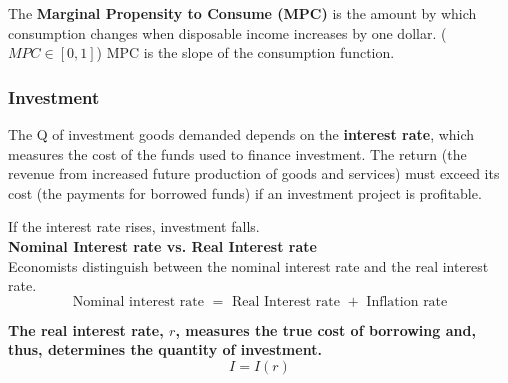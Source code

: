 \documentclass[12pt]{article}
\begin{document}
The {\textbf {Marginal Propensity to Consume (MPC)}} is the amount by which consumption
changes when disposable income increases by one dollar. ($ MPC \in [0,1] $)
MPC is the slope of the consumption function.

\begin{figure}[H]
\end{figure}

\subsubsection{Investment}
The Q of investment goods demanded depends on the {\textbf {interest rate}}, which
measures the cost of the funds used to finance investment. The return (the revenue
from increased future production of goods and services) must exceed its cost (the 
payments for borrowed funds) if an investment project is profitable.

If the interest rate rises, investment falls.\\

{\textbf {Nominal Interest rate vs. Real Interest rate}}\\
Economists distinguish between the nominal interest rate and the real interest rate.
\begin{equation*}
\text{ Nominal interest rate } = \text{ Real Interest rate } + \text{ Inflation rate }
\end{equation*}

{\textbf {The real interest rate, $ r $, measures the true cost of borrowing and, 
thus, determines the quantity of investment.}}
\begin{equation*}
I = I(r)
\end{equation*}
\end{document}
